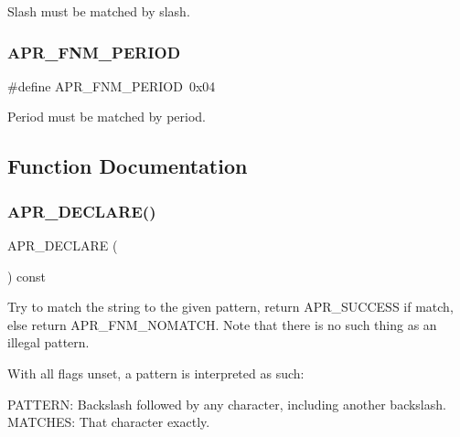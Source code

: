 Slash must be matched by slash. \mbox{\label{group__apr__fnmatch_ga4806f936b6eacc59dfed831d67b750ef}} 
\subsubsection{\texorpdfstring{A\+P\+R\+\_\+\+F\+N\+M\+\_\+\+P\+E\+R\+I\+OD}{APR\_FNM\_PERIOD}}
{\footnotesize\ttfamily \#define A\+P\+R\+\_\+\+F\+N\+M\+\_\+\+P\+E\+R\+I\+OD~0x04}

Period must be matched by period. 

\subsection{Function Documentation}
\mbox{\label{group__apr__fnmatch_gaaa224db42fb6857159b6b7049451ddea}} 
\subsubsection{\texorpdfstring{A\+P\+R\+\_\+\+D\+E\+C\+L\+A\+R\+E()}{APR\_DECLARE()}}
{\footnotesize\ttfamily A\+P\+R\+\_\+\+D\+E\+C\+L\+A\+RE (\begin{DoxyParamCaption}\item[{\mbox{\hyperlink{group__apr__errno_gaf76ee4543247e9fb3f3546203e590a6c}{apr\+\_\+status\+\_\+t}}}]{ }\end{DoxyParamCaption}) const}

Try to match the string to the given pattern, return A\+P\+R\+\_\+\+S\+U\+C\+C\+E\+SS if match, else return A\+P\+R\+\_\+\+F\+N\+M\+\_\+\+N\+O\+M\+A\+T\+CH. Note that there is no such thing as an illegal pattern.

With all flags unset, a pattern is interpreted as such\+:

P\+A\+T\+T\+E\+RN\+: Backslash followed by any character, including another backslash.~\newline
 M\+A\+T\+C\+H\+ES\+: That character exactly.

